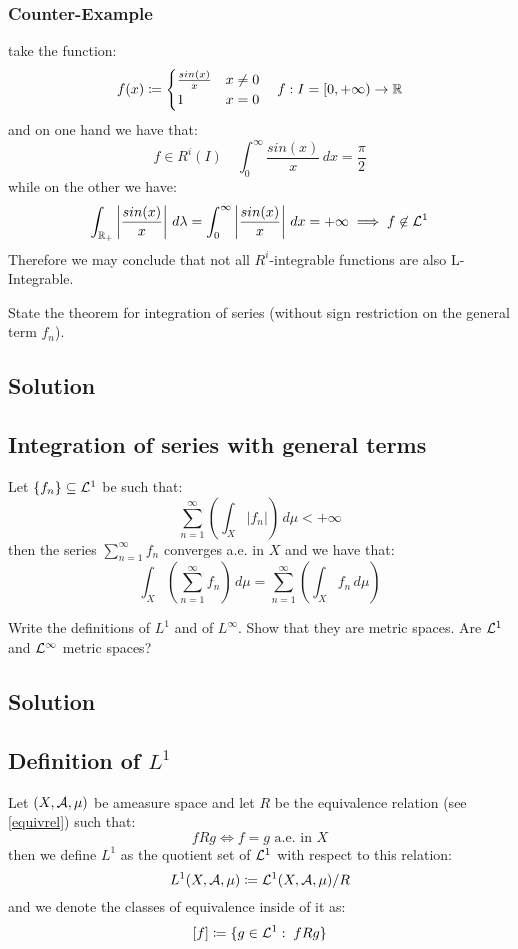 \subsubsection{Counter-Example}
take the function:
\[
    f(x) \coloneqq \begin{cases}
        \frac{sin(x)}{x}  & x\neq 0\\
        1   & x=0
    \end{cases} \quad f: I=[0,+\infty)\to \mathbb{R}   
\]
and on one hand we have that:
\[
    f\in R^i(I) \quad \int_0^\infty \frac{sin(x)}{x} \, dx = \frac{\pi}{2}     
\]
while on the other we have:
\[
    \int_{\mathbb{R}_+} \left| \frac{sin(x)}{x} \right| \, d\lambda = \int_0^\infty \left| \frac{sin(x)}{x} \right| \, dx = +\infty \implies f\not\in \mathcal{L}^1
\]
Therefore we may conclude that not all $R^i$-integrable functions are also L-Integrable.


\question
State the theorem for integration of series (without sign restriction on the general term $f_n$).

\subsection*{Solution}

\subsection{Integration of series with general terms}
Let $\{ f_n \}\subseteq \mathcal{L}^1$ be such that:
\[
    \sum_{n=1}^\infty \left( \int_X | f_n | \right) \, d\mu < +\infty    
\]
then the series $\sum_{n=1}^\infty f_n$ converges a.e. in $X$ and we have that:
\[
    \int_X \left( \sum_{n=1}^\infty f_n \right) \, d\mu = \sum_{n=1}^\infty \left( \int_X f_n \, d\mu \right)   
\] 


\question
Write the definitions of $L^1$ and of $L^\infty$. Show that they are metric spaces. Are $\mathcal{L}^1$ and $\mathcal{L}^\infty$ metric spaces?

\subsection*{Solution}

\subsection{Definition of \texorpdfstring{$L^1$}{L1}}
Let $(X,\mathcal{A},\mu)$ be ameasure space and let $R$ be the equivalence relation (see \ref{equivrel}) such that:
\[
    fRg \iff f=g \text{ a.e. in } X
\]
then we define $L^1$ as the quotient set of $\mathcal{L}^1$ with respect to this relation:
\[
    L^1 (X,\mathcal{A},\mu) \coloneqq \mathcal{L}^1(X,\mathcal{A},\mu) / R    
\]
and we denote the classes of equivalence inside of it as:
\[
    [f] \coloneqq \{ g\in\mathcal{L}^1 : \; fRg\}    
\]


